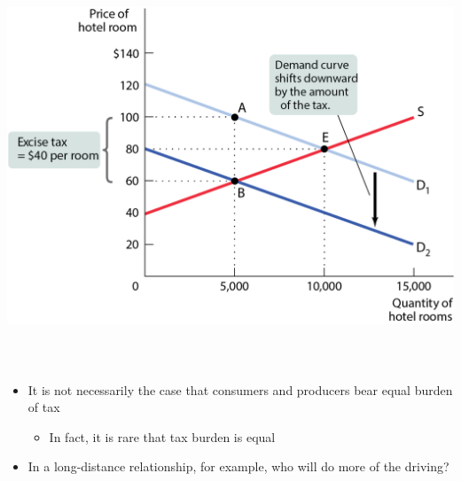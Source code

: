 \documentclass[
  ignorenonframetext,
]{beamer}
\providecommand{\tightlist}{%
  \setlength{\itemsep}{0pt}\setlength{\parskip}{0pt}}
\begin{document}
\begin{frame}{}
\protect\hypertarget{section-8}{}
\includegraphics[width=\textwidth,height=4.6875in]{figures/fig14_3.png}
\end{frame}

\begin{frame}{}
\protect\hypertarget{section-9}{}
\begin{itemize}
\tightlist
\item
  It is not necessarily the case that consumers and producers bear equal
  burden of tax

  \begin{itemize}
  \tightlist
  \item
    In fact, it is rare that tax burden is equal
  \end{itemize}
\item
  In a long-distance relationship, for example, who will do more of the
  driving?
\end{itemize}
\end{frame}
\end{document}
